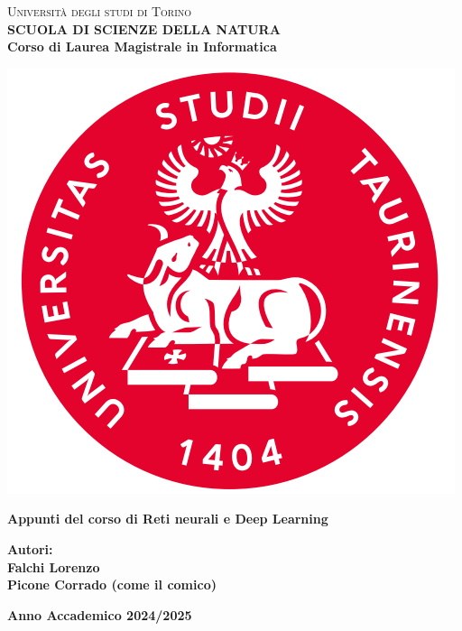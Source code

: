 \begin{titlepage}
\begin{center}
{{\Large{\textsc{Universit\`a degli studi di Torino \\}}}} \vspace{5mm} {\small{\bf SCUOLA DI SCIENZE DELLA NATURA\\ \vspace{3mm}
Corso di Laurea Magistrale in Informatica}}
\vspace{5mm}
\end{center}
\begin{center}
\includegraphics[scale=.3]{head/logo.png}
\end{center}
\begin{center}
\vspace{5mm}
{\LARGE{\bf Appunti del corso di Reti neurali e Deep Learning}}
\end{center}
\hfill
\begin{minipage}[t]{0.47\textwidth}\raggedleft
\vspace{20mm}
{\large{\bf Autori:\\
Falchi Lorenzo\\
Picone Corrado (come il comico)}}
\end{minipage}
\vspace{10mm}
\begin{center}
{\large{\bf 
Anno Accademico 2024/2025}}
\end{center}

\end{titlepage}
\newpage\null\thispagestyle{empty}\newpage
